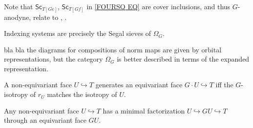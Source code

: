 \documentclass[a4paper,10pt,draft]{article}%
\begin{document}
\begin{remark}
	Note that $\mathsf{Sc}_{T[Ge]}$, $\mathsf{Sc}_{T[Gf]}$
	in \eqref{FOURSQ EQ}
	are cover inclusions, and thus $G$-anodyne, relate to 
	\cite[\S 6.2]{Rez10}, \cite[\S 10]{Rez01}.
\end{remark}


\begin{remark}
Indexing systems are precisely the Segal sieves of $\Omega_G$.
\end{remark}

\begin{remark}
{\color{blue} bla bla} the diagrams for compositions of norm maps are given by orbital representations, but the category $\Omega_G$ is better described in terms of the expanded representation.
\end{remark}




\begin{lemma}
	A non-equivariant face $U \hookrightarrow T$ generates an equivariant face $G\cdot U \hookrightarrow T$ iff the $G$-isotropy of $r_U$ matches the isotropy of $U$.
\end{lemma}






\begin{proposition}
	Any non-equivariant face $U \hookrightarrow T$ has a minimal factorization
	$U \hookrightarrow GU \hookrightarrow T$
	through an equivariant face $GU$.
\end{proposition}
\end{document}
